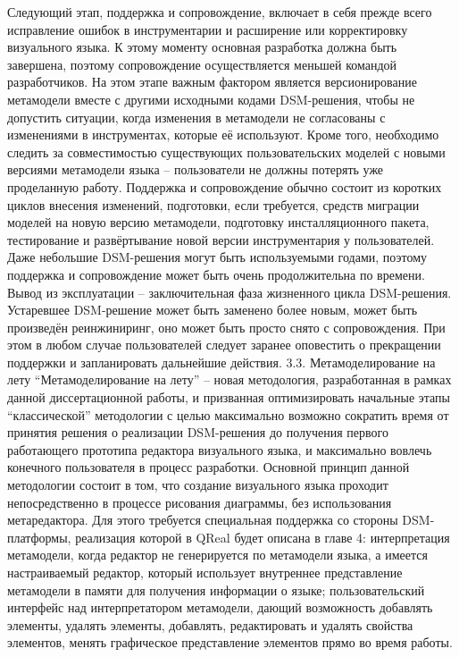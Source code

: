 	Следующий этап, поддержка и сопровождение, включает в себя прежде всего исправление ошибок в инструментарии и расширение или корректировку визуального языка. К этому моменту основная разработка должна быть завершена, поэтому сопровождение осуществляется меньшей командой разработчиков. На этом этапе важным фактором является версионирование метамодели вместе с другими исходными кодами DSM-решения, чтобы не допустить ситуации, когда изменения в метамодели не согласованы с изменениями в инструментах, которые её используют. Кроме того, необходимо следить за совместимостью существующих пользовательских моделей с новыми версиями метамодели языка – пользователи не должны потерять уже проделанную работу. Поддержка и сопровождение обычно состоит из коротких циклов внесения изменений, подготовки, если требуется, средств миграции моделей на новую версию метамодели, подготовку инсталляционного пакета, тестирование и развёртывание новой версии инструментария у пользователей. Даже небольшие DSM-решения могут быть используемыми годами, поэтому поддержка и сопровождение может быть очень продолжительна по времени.
	Вывод из эксплуатации – заключительная фаза жизненного цикла DSM-решения. Устаревшее DSM-решение может быть заменено более новым, может быть произведён реинжиниринг, оно может быть просто снято с сопровождения. При этом в любом случае пользователей следует заранее оповестить о прекращении поддержки и запланировать дальнейшие действия.
3.3. Метамоделирование на лету
	“Метамоделирование на лету” – новая методология, разработанная в рамках данной диссертационной работы, и призванная оптимизировать начальные этапы “классической” методологии с целью максимально возможно сократить время от принятия решения о реализации DSM-решения до получения первого работающего прототипа редактора визуального языка, и максимально вовлечь конечного пользователя в процесс разработки. Основной принцип данной методологии состоит в том, что создание визуального языка проходит непосредственно в процессе рисования диаграммы, без использования метаредактора. Для этого требуется специальная поддержка со стороны DSM-платформы, реализация которой в QReal будет описана в главе 4:
интерпретация метамодели, когда редактор не генерируется по метамодели языка, а имеется настраиваемый редактор, который использует внутреннее представление метамодели в памяти для получения информации о языке;
пользовательский интерфейс над интерпретатором метамодели, дающий возможность добавлять элементы, удалять элементы, добавлять, редактировать и удалять свойства элементов, менять графическое представление элементов прямо во время работы.
